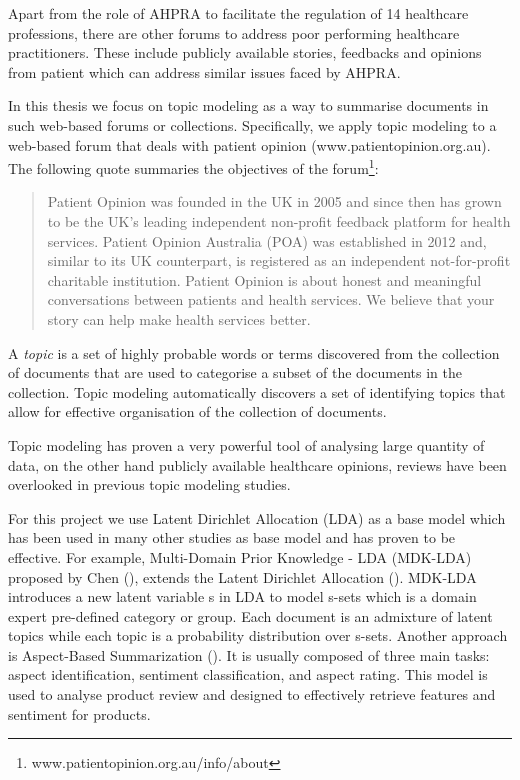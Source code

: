 \documentclass[11pt,twoside]{report}
\begin{document}
Apart from the role of AHPRA to facilitate the regulation of 14 
healthcare professions, there are other forums to address 
poor performing healthcare practitioners. These include publicly 
available stories, feedbacks and opinions from patient which can address 
similar issues faced by AHPRA.  

In this thesis we
focus on topic modeling as a way to summarise documents in such web-based 
forums or collections. Specifically, we apply topic modeling to a web-based
forum that deals with patient opinion (www.patientopinion.org.au). 
The following quote summaries the objectives of the 
forum\footnote{www.patientopinion.org.au/info/about}:

\begin{quote}Patient Opinion was founded in the UK in 2005 and since then has grown 
to be the UK's leading independent non-profit feedback platform for health 
services. Patient Opinion Australia (POA) was established in 2012 and, 
similar to its UK counterpart, is registered as an independent not-for-profit 
charitable institution. Patient Opinion is about honest and meaningful 
conversations between patients and health services. We believe that your 
story can help make health services better.
\end{quote}

A \emph{topic} is a set of highly probable words or terms 
discovered from the collection
of documents that
are used to categorise a subset
of the documents in the collection. 
Topic modeling automatically discovers a set of
identifying topics that allow for effective organisation of the collection
of documents. 

Topic modeling has proven a very powerful tool of analysing large quantity of data, on the other hand publicly available healthcare opinions, reviews have been overlooked in previous topic modeling studies.

For this project we use Latent Dirichlet Allocation (LDA) as a base model which has been used in many other studies as base model and has proven to be effective. For example, Multi-Domain Prior Knowledge - LDA (MDK-LDA) proposed by Chen (\cite{ref24}),  extends the Latent Dirichlet Allocation (\cite{ref25}). MDK-LDA introduces a new latent variable s in LDA to model s-sets which is a domain expert pre-defined category or group. Each document is an admixture of latent topics while each topic is a probability distribution over s-sets. Another approach is Aspect-Based Summarization (\cite{ref11}). It is usually composed of three main tasks: aspect identification, sentiment classification, and aspect rating. This model is used to analyse product review and designed to effectively retrieve features and sentiment for products.
\end{document}
